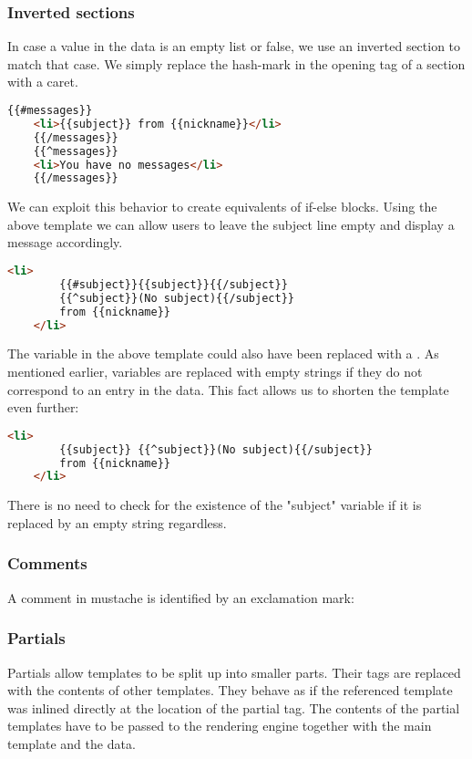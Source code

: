 \subsubsection{Inverted sections}
In case a value in the data is an empty list or false, we use an inverted
section to match that case. We simply replace the hash-mark in the opening tag
of a section with a caret.
\begin{lstlisting}[language=HTML]
	{{#messages}}
	<li>{{subject}} from {{nickname}}</li>
	{{/messages}}
	{{^messages}}
	<li>You have no messages</li>
	{{/messages}}
\end{lstlisting}

We can exploit this behavior to create equivalents of if-else blocks.
Using the above template we can allow users to leave the subject line empty
and display a message accordingly.
\begin{lstlisting}[language=HTML]
	<li>
		{{#subject}}{{subject}}{{/subject}}
		{{^subject}}(No subject){{/subject}}
		from {{nickname}}
	</li>
\end{lstlisting}

The  variable in the above template could also have been
replaced with a . As mentioned earlier, variables are replaced
with empty strings if they do not correspond to an entry in the data.
This fact allows us to shorten the template even further:
\begin{lstlisting}[language=HTML]
	<li>
		{{subject}} {{^subject}}(No subject){{/subject}}
		from {{nickname}}
	</li>
\end{lstlisting}

There is no need to check for the existence of the "subject" variable if it is
replaced by an empty string regardless.

\subsubsection{Comments}
A comment in mustache is identified by an exclamation mark:

\subsubsection{Partials}
Partials allow templates to be split up into smaller parts. Their tags are
replaced with the contents of other templates. They behave as if the referenced
template was inlined directly at the location of the partial tag.
The contents of the partial templates have to be passed to the rendering engine
together with the main template and the data.

